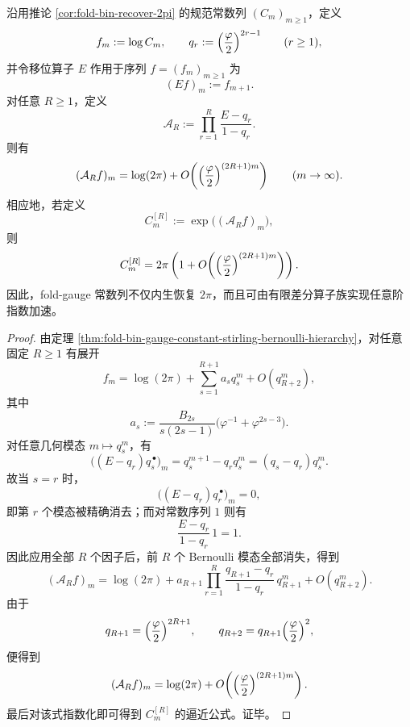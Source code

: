 \begin{theorem}\label{thm:xi-time-part9s-gauge-shift-operator-accelerator}
沿用推论 \ref{cor:fold-bin-recover-2pi} 的规范常数列 \((C_m)_{m\ge 1}\)，定义
\[
f_m:=\log C_m,
\qquad
q_r:=\Bigl(\frac{\varphi}{2}\Bigr)^{2r-1}
\qquad (r\ge 1),
\]
并令移位算子 \(E\) 作用于序列 \(f=(f_m)_{m\ge 1}\) 为
\[
(Ef)_m:=f_{m+1}.
\]
对任意 \(R\ge 1\)，定义
\[
\mathcal A_R:=
\prod_{r=1}^{R}\frac{E-q_r}{1-q_r}.
\]
则有
\[
(\mathcal A_R f)_m
=
\log(2\pi)
+O\!\left(\Bigl(\frac{\varphi}{2}\Bigr)^{(2R+1)m}\right)
\qquad (m\to\infty).
\]
相应地，若定义
\[
C_m^{[R]}:=\exp\bigl((\mathcal A_R f)_m\bigr),
\]
则
\[
C_m^{[R]}
=
2\pi\left(
1+O\!\left(\Bigl(\frac{\varphi}{2}\Bigr)^{(2R+1)m}\right)
\right).
\]
因此，fold-gauge 常数列不仅内生恢复 \(2\pi\)，而且可由有限差分算子族实现任意阶指数加速。
\end{theorem}
\begin{proof}
由定理 \ref{thm:fold-bin-gauge-constant-stirling-bernoulli-hierarchy}，对任意固定 \(R\ge 1\) 有展开
\[
f_m
=
\log(2\pi)+\sum_{s=1}^{R+1}a_s q_s^m+O(q_{R+2}^m),
\]
其中
\[
a_s:=
\frac{B_{2s}}{s(2s-1)}
\bigl(\varphi^{-1}+\varphi^{2s-3}\bigr).
\]
对任意几何模态 \(m\mapsto q_s^m\)，有
\[
\bigl((E-q_r)q_s^{\,\bullet}\bigr)_m
=
q_s^{m+1}-q_r q_s^m
=
(q_s-q_r)q_s^m.
\]
故当 \(s=r\) 时，
\[
\bigl((E-q_r)q_r^{\,\bullet}\bigr)_m=0,
\]
即第 \(r\) 个模态被精确消去；而对常数序列 \(1\) 则有
\[
\frac{E-q_r}{1-q_r}\,1=1.
\]
因此应用全部 \(R\) 个因子后，前 \(R\) 个 Bernoulli 模态全部消失，得到
\[
(\mathcal A_R f)_m
=
\log(2\pi)
+a_{R+1}
\prod_{r=1}^{R}\frac{q_{R+1}-q_r}{1-q_r}\,q_{R+1}^m
+O(q_{R+2}^m).
\]
由于
\[
q_{R+1}=\Bigl(\frac{\varphi}{2}\Bigr)^{2R+1},
\qquad
q_{R+2}=q_{R+1}\Bigl(\frac{\varphi}{2}\Bigr)^2,
\]
便得到
\[
(\mathcal A_R f)_m
=
\log(2\pi)
+O\!\left(\Bigl(\frac{\varphi}{2}\Bigr)^{(2R+1)m}\right).
\]
最后对该式指数化即可得到 \(C_m^{[R]}\) 的逼近公式。证毕。
\end{proof}

\endinput
